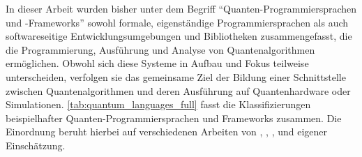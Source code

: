 In dieser Arbeit wurden bisher unter dem Begriff \enquote{Quanten-Programmiersprachen und -Frameworks} sowohl formale, eigenständige Programmiersprachen als auch softwareseitige Entwicklungsumgebungen und Bibliotheken zusammengefasst, die die Programmierung, Ausführung und Analyse von Quantenalgorithmen ermöglichen. Obwohl sich diese Systeme in Aufbau und Fokus teilweise unterscheiden, verfolgen sie das gemeinsame Ziel der Bildung einer Schnittstelle zwischen Quantenalgorithmen und deren Ausführung auf Quantenhardware oder Simulationen. \autoref{tab:quantum_languages_full} fasst die Klassifizierungen beispielhafter Quanten-Programmiersprachen und Frameworks zusammen. Die Einordnung beruht hierbei auf verschiedenen Arbeiten von \autocite{singhSurveyAvailableTools2024a}, \autocite{ferreiraExploratoryStudyUsage2025}, \autocite{garhwal_quantum_2021}, \autocite{serranoQuantumSoftwareComponents2023a} und eigener Einschätzung.

